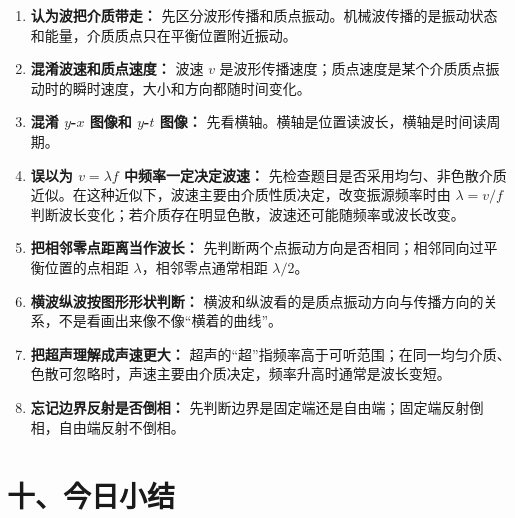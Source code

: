 \begin{mistakebox}
\begin{enumerate}
  \item \textbf{认为波把介质带走：} 先区分波形传播和质点振动。机械波传播的是振动状态和能量，介质质点只在平衡位置附近振动。

  \item \textbf{混淆波速和质点速度：} 波速 $v$ 是波形传播速度；质点速度是某个介质质点振动时的瞬时速度，大小和方向都随时间变化。

  \item \textbf{混淆 $y$-$x$ 图像和 $y$-$t$ 图像：} 先看横轴。横轴是位置读波长，横轴是时间读周期。

  \item \textbf{误以为 $v=\lambda f$ 中频率一定决定波速：} 先检查题目是否采用均匀、非色散介质近似。在这种近似下，波速主要由介质性质决定，改变振源频率时由 $\lambda=v/f$ 判断波长变化；若介质存在明显色散，波速还可能随频率或波长改变。

  \item \textbf{把相邻零点距离当作波长：} 先判断两个点振动方向是否相同；相邻同向过平衡位置的点相距 $\lambda$，相邻零点通常相距 $\lambda/2$。

  \item \textbf{横波纵波按图形形状判断：} 横波和纵波看的是质点振动方向与传播方向的关系，不是看画出来像不像“横着的曲线”。

  \item \textbf{把超声理解成声速更大：} 超声的“超”指频率高于可听范围；在同一均匀介质、色散可忽略时，声速主要由介质决定，频率升高时通常是波长变短。

  \item \textbf{忘记边界反射是否倒相：} 先判断边界是固定端还是自由端；固定端反射倒相，自由端反射不倒相。
\end{enumerate}
\end{mistakebox}

\section*{十、今日小结}

